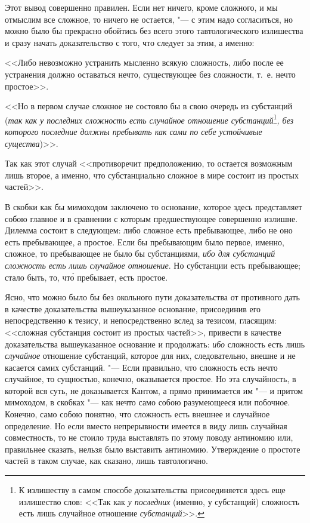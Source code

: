 Этот вывод совершенно правилен. Если нет ничего, кроме сложного, и мы
отмыслим все сложное, то ничего не остается, "--- с этим надо согласиться, но
можно было бы прекрасно обойтись без всего этого тавтологического излишества
и сразу начать доказательство с того, что следует за этим, а именно:

<<Либо невозможно устранить мысленно всякую сложность, либо после ее
устранения должно оставаться нечто, существующее без сложности, т.~е. нечто
простое>>.

<<Но в первом случае сложное не состояло бы в свою очередь из субстанций
({\em так как у последних сложность есть случайное
отношение субстанций}\footnote{К излишеству в самом способе
доказательства присоединяется здесь еще излишество слов: <<Так как
{\em у последних} (именно, у субстанций) сложность есть лишь случайное
отношение {\em субстанций}>>.}{\em , без которого последние должны
пребывать как сами по себе устойчивые существа})>>.

Так как этот случай <<противоречит предположению, то остается возможным лишь
второе, а именно, что субстанциально сложное в мире состоит из простых
частей>>.

В скобки как бы мимоходом заключено то основание, которое здесь представляет
собою главное и в сравнении с которым предшествующее совершенно излишне.
Дилемма состоит в следующем: либо сложное есть пребывающее, либо не оно
есть пребывающее, а простое. Если бы пребывающим было первое, именно,
сложное, то пребывающее не было бы субстанциями, {\em ибо для субстанций
сложность есть лишь случайное отношение}. Но субстанции есть пребывающее;
стало быть, то, чт\'{о} пребывает, есть простое.

Ясно, что можно было бы без окольного пути доказательства от противного дать
в качестве доказательства вышеуказанное основание, присоединив его
непосредственно к тезису, и непосредственно вслед за тезисом, гласящим:
<<сложная субстанция состоит из простых частей>>, привести в качестве
доказательства вышеуказанное основание и продолжать:
{\em ибо} сложность есть лишь
{\em случайное} отношение субстанций, которое для них,
следовательно, внешне и не касается самих субстанций. "--- Если правильно, что
сложность есть нечто случайное, то сущностью, конечно, оказывается простое.
Но эта случайность, в которой вся суть, не доказывается Кантом, а прямо
принимается им "--- и притом мимоходом, в скобках "--- как нечто само собою
разумеющееся или побочное. Конечно, само собою понятно, что сложность есть
внешнее и случайное определение. Но если вместо непрерывности имеется в
виду лишь случайная совместность, то не стоило труда выставлять по этому
поводу антиномию или, правильнее сказать, нельзя было выставить антиномию.
Утверждение о простоте частей в таком случае, как сказано, лишь
тавтологично.

